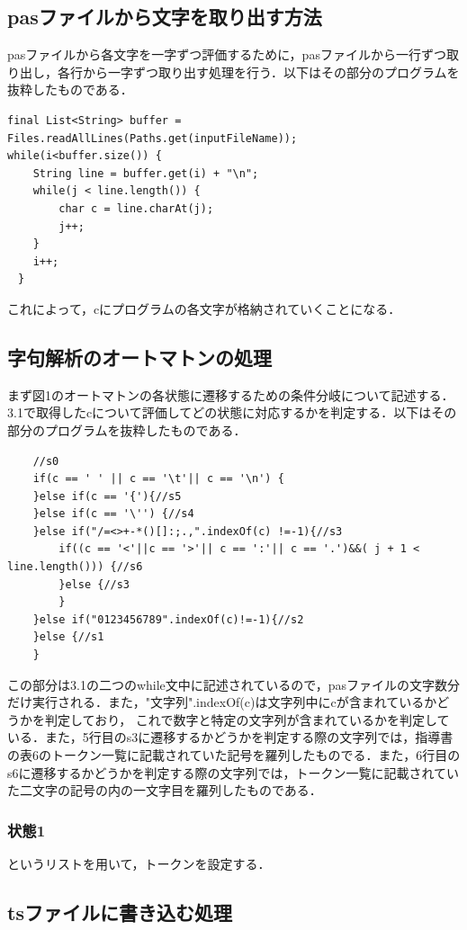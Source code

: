 \documentclass[dvipdfmx]{jarticle}
\begin{document}
\subsection{pasファイルから文字を取り出す方法}
pasファイルから各文字を一字ずつ評価するために，pasファイルから一行ずつ取り出し，各行から一字ずつ取り出す処理を行う．以下はその部分のプログラムを抜粋したものである．
\begin{lstlisting}
final List<String> buffer = Files.readAllLines(Paths.get(inputFileName));
while(i<buffer.size()) {
    String line = buffer.get(i) + "\n";
    while(j < line.length()) {
        char c = line.charAt(j);
        j++;
    }			
    i++;
　}
\end{lstlisting}
これによって，cにプログラムの各文字が格納されていくことになる．
\subsection{字句解析のオートマトンの処理}
まず図1のオートマトンの各状態に遷移するための条件分岐について記述する．3.1で取得したcについて評価してどの状態に対応するかを判定する．以下はその部分のプログラムを抜粋したものである．
\begin{lstlisting}
    //s0
    if(c == ' ' || c == '\t'|| c == '\n') {
    }else if(c == '{'){//s5
    }else if(c == '\'') {//s4
    }else if("/=<>+-*()[]:;.,".indexOf(c) !=-1){//s3
        if((c == '<'||c == '>'|| c == ':'|| c == '.')&&( j + 1 < line.length())) {//s6
        }else {//s3
        }
    }else if("0123456789".indexOf(c)!=-1){//s2
    }else {//s1
    }
\end{lstlisting}
この部分は3.1の二つのwhile文中に記述されているので，pasファイルの文字数分だけ実行される．また，"文字列".indexOf(c)は文字列中にcが含まれているかどうかを判定しており，
これで数字と特定の文字列が含まれているかを判定している．また，5行目のs3に遷移するかどうかを判定する際の文字列では，指導書の表6のトークン一覧に記載されていた記号を羅列したものでる．また，6行目のs6に遷移するかどうかを判定する際の文字列では，トークン一覧に記載されていた二文字の記号の内の一文字目を羅列したものである．
\subsubsection{状態1}
というリストを用いて，トークンを設定する．
\subsection{tsファイルに書き込む処理}
\end{document}
